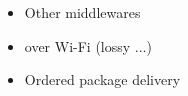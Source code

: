 \chapter{}
\label{sec:conclusion_and_outlook}
\begin{itemize}
    \item Other middlewares
    \item over Wi-Fi (lossy ...)
    \item Ordered package delivery
\end{itemize}